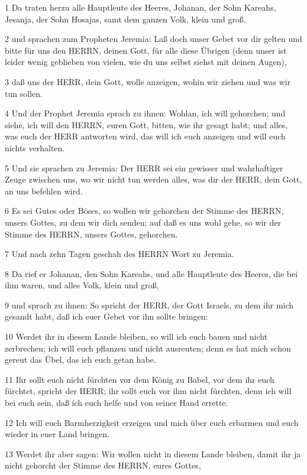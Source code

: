 \par 1 Da traten herzu alle Hauptleute des Heeres, Johanan, der Sohn Kareahs, Jesanja, der Sohn Hosajas, samt dem ganzen Volk, klein und groß,
\par 2 und sprachen zum Propheten Jeremia: Laß doch unser Gebet vor dir gelten und bitte für uns den HERRN, deinen Gott, für alle diese Übrigen (denn unser ist leider wenig geblieben von vielen, wie du uns selbst siehst mit deinen Augen),
\par 3 daß uns der HERR, dein Gott, wolle anzeigen, wohin wir ziehen und was wir tun sollen.
\par 4 Und der Prophet Jeremia sprach zu ihnen: Wohlan, ich will gehorchen; und siehe, ich will den HERRN, euren Gott, bitten, wie ihr gesagt habt; und alles, was euch der HERR antworten wird, das will ich euch anzeigen und will euch nichts verhalten.
\par 5 Und sie sprachen zu Jeremia: Der HERR sei ein gewisser und wahrhaftiger Zeuge zwischen uns, wo wir nicht tun werden alles, was dir der HERR, dein Gott, an uns befehlen wird.
\par 6 Es sei Gutes oder Böses, so wollen wir gehorchen der Stimme des HERRN, unsers Gottes, zu dem wir dich senden; auf daß es uns wohl gehe, so wir der Stimme des HERRN, unsers Gottes, gehorchen.
\par 7 Und nach zehn Tagen geschah des HERRN Wort zu Jeremia.
\par 8 Da rief er Johanan, den Sohn Kareahs, und alle Hauptleute des Heeres, die bei ihm waren, und alles Volk, klein und groß,
\par 9 und sprach zu ihnen: So spricht der HERR, der Gott Israels, zu dem ihr mich gesandt habt, daß ich euer Gebet vor ihn sollte bringen:
\par 10 Werdet ihr in diesem Lande bleiben, so will ich euch bauen und nicht zerbrechen; ich will euch pflanzen und nicht ausreuten; denn es hat mich schon gereut das Übel, das ich euch getan habe.
\par 11 Ihr sollt euch nicht fürchten vor dem König zu Babel, vor dem ihr euch fürchtet, spricht der HERR; ihr sollt euch vor ihm nicht fürchten, denn ich will bei euch sein, daß ich euch helfe und von seiner Hand errette.
\par 12 Ich will euch Barmherzigkeit erzeigen und mich über euch erbarmen und euch wieder in euer Land bringen.
\par 13 Werdet ihr aber sagen: Wir wollen nicht in diesem Lande bleiben, damit ihr ja nicht gehorcht der Stimme des HERRN, eures Gottes,
